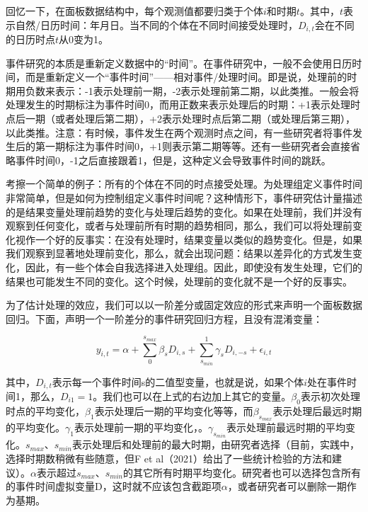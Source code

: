 \documentclass[cn,12pt,math=newtx,citestyle=gb7714-2015,bibstyle=gb7714-2015]{elegantbook}
\begin{document}
	回忆一下，在面板数据结构中，每个观测值都要归类于个体$i$和时期$t$。其中，$t$表示自然/日历时间：年月日。当不同的个体在不同时间接受处理时，$D_{i,t}$会在不同的日历时点$t$从0变为1。
	
	事件研究的本质是重新定义数据中的“时间”。在事件研究中，一般不会使用日历时间，而是重新定义一个“事件时间”——相对事件/处理时间。即是说，处理前的时期用负数来表示：-1表示处理前一期，-2表示处理前第二期，以此类推。一般会将处理发生的时期标注为事件时间0，而用正数来表示处理后的时期：+1表示处理时点后一期（或者处理后第二期），+2表示处理时点后第二期（或处理后第三期），以此类推。注意：有时候，事件发生在两个观测时点之间，有一些研究者将事件发生后的第一期标注为事件时间0，+1则表示第二期等等。还有一些研究者会直接省略事件时间0，-1之后直接跟着1，但是，这种定义会导致事件时间的跳跃。
	
	考擦一个简单的例子：所有的个体在不同的时点接受处理。为处理组定义事件时间非常简单，但是如何为控制组定义事件时间呢？这种情形下，事件研究估计量描述的是结果变量处理前趋势的变化与处理后趋势的变化。如果在处理前，我们并没有观察到任何变化，或者与处理前所有时期的趋势相同，那么，我们可以将处理前变化视作一个好的反事实：在没有处理时，结果变量以类似的趋势变化。但是，如果我们观察到显著地处理前变化，那么，就会出现问题：结果以差异化的方式发生变化，因此，有一些个体会自我选择进入处理组。因此，即使没有发生处理，它们的结果也可能发生不同的变化。这个时候，处理前的变化就不是一个好的反事实。
	
	为了估计处理的效应，我们可以以一阶差分或固定效应的形式来声明一个面板数据回归。下面，声明一个一阶差分的事件研究回归方程，且没有混淆变量：
	
		\begin{equation}
	y_{i,t} = \alpha +\sum_0^{s_{max}} \beta_s D_{i,s} +\sum_{s_{min}}^{1} \gamma_s D_{i,-s}+\epsilon_{i,t}
	\end{equation}
	
	其中，$D_{i,t}$表示每一个事件时间s的二值型变量，也就是说，如果个体$i$处在事件时间1，那么，$D_{i1}=1$。我们也可以在上式的右边加上其它的变量。$\beta_0$表示初次处理时点的平均变化，$\beta_1$表示处理后一期的平均变化等等，而$\beta_{s_{max}}$表示处理后最远时期的平均变化。$\gamma_1$表示处理前一期的平均变化，。$\gamma_{s_{min}}$表示处理前最远时期的平均变化。$s_{max}$、$s_{min}$表示处理后和处理前的最大时期，由研究者选择（目前，实践中，选择时期数稍微有些随意，但F et al（2021）给出了一些统计检验的方法和建议）。$\alpha$表示超过$s_{max}$、$s_{min}$的其它所有时期平均变化。研究者也可以选择包含所有的事件时间虚拟变量D，这时就不应该包含截距项$\alpha$，或者研究者可以删除一期作为基期。
	
\end{document}
